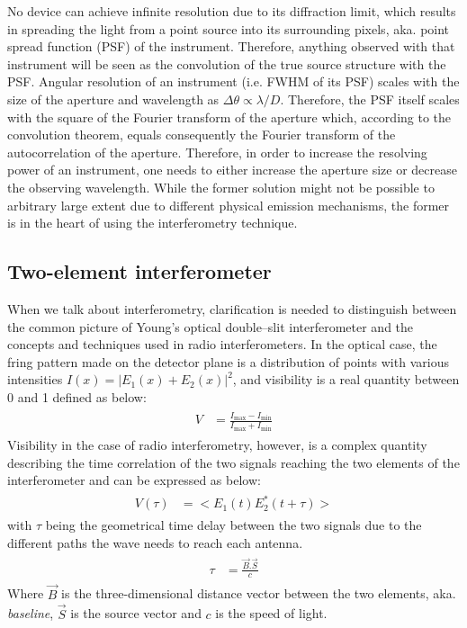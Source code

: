 \documentclass[paper=a4, fontsize=11pt]{scrartcl} %
\numberwithin{equation}{section} %
\numberwithin{figure}{section} %
\numberwithin{table}{section} %
\begin{document}
No device can achieve infinite resolution due to its diffraction limit, which results in spreading the light from a point source into its surrounding pixels, aka. point spread function (PSF) of the instrument. Therefore, anything observed with that instrument will be seen as the convolution of the true source structure with the PSF. Angular resolution of an instrument (i.e. FWHM of its PSF) scales with the size of the aperture and wavelength as $\Delta\theta \propto \lambda / D$. Therefore, the PSF itself scales with the square of the Fourier transform of the aperture which, according to the convolution theorem, equals consequently the Fourier transform of the autocorrelation of the aperture. Therefore, in order to increase the resolving power of an instrument, one needs to either increase the aperture size or decrease the observing wavelength. While the former solution might not be possible to arbitrary large extent due to different physical emission mechanisms, the former is in the heart of using the interferometry technique.    
 
\subsection{Two-element interferometer}
When we talk about interferometry, clarification is needed to distinguish between the common picture of Young's optical double--slit interferometer and the concepts and techniques used in radio interferometers. In the optical case, the fring pattern made on the detector plane is a distribution of points with various intensities $I(x) = |E_1(x) + E_2(x)|^2$, and visibility is a real quantity between 0 and 1 defined as below:
\begin{align} 
\begin{split}
V &= \frac{I_\mathrm{max} - I_\mathrm{min}}{I_\mathrm{max} + I_\mathrm{min}}
\end{split}                    
\end{align}
Visibility in the case of radio interferometry, however, is a complex quantity describing the time correlation of the two signals reaching the two elements of the interferometer and can be expressed as below:
\begin{align} 
\begin{split}
\label{eq:vis_def}
V(\tau) &= <E_1(t)E_2^*(t+\tau)>
\end{split}                    
\end{align}
with $\tau$ being the geometrical time delay between the two signals due to the different paths the wave needs to reach each antenna.
\begin{align} 
\begin{split}
\tau &= \frac{\vec{B}.\vec{S}}{c}
\end{split}                    
\end{align}
Where $\vec{B}$ is the three-dimensional distance vector between the two elements, aka. \emph{baseline}, $\vec{S}$ is the source vector and $c$ is the speed of light.
\end{document}

